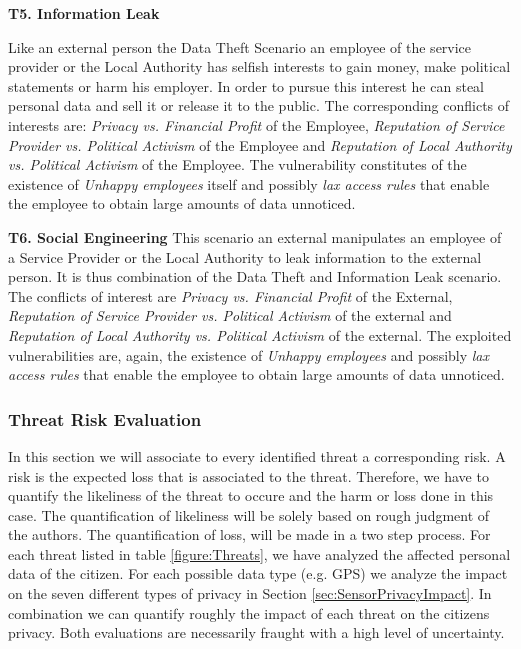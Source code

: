 \documentclass[runningheads,a4paper]{llncs}
\begin{document}
\textbf{T5. Information Leak}

Like an external person the Data Theft Scenario an employee of the
service provider or the Local Authority has selfish interests to gain
money, make political statements or harm his employer.  In order to
pursue this interest he can steal personal data and sell it or release
it to the public.  The corresponding conflicts of interests are:
\textit{Privacy vs. Financial Profit} of the Employee, \textit{Reputation of Service
  Provider vs. Political Activism} of the Employee and \textit{Reputation of Local
  Authority vs. Political Activism} of the Employee.  The vulnerability constitutes of
the existence of \textit{Unhappy employees} itself and possibly \textit{lax access
rules} that enable the employee to obtain large amounts of data
unnoticed.

\textbf{T6. Social Engineering}
This scenario an external manipulates an employee of a Service
Provider or the Local Authority to leak information to the external
person.  It is thus combination of the Data Theft and Information Leak
scenario.
The conflicts of interest are \textit{Privacy vs. Financial Profit} of
the External, \textit{Reputation of Service Provider vs. Political
  Activism} of the external and \textit{Reputation of Local Authority
  vs. Political Activism} of the external.  The exploited
vulnerabilities are, again, the existence of \textit{Unhappy
  employees} and possibly \textit{lax access rules} that enable the
employee to obtain large amounts of data unnoticed.


\subsubsection{Threat Risk Evaluation}

In this section we will associate to every identified threat a corresponding risk. A risk is the expected loss that is associated to the threat.
Therefore, we have to quantify the likeliness of the threat to occure and the harm or loss done in this case.
The quantification of likeliness will be solely based on rough judgment of the authors.
The quantification of loss, will be made in a two step process.
For each threat listed in table \ref{figure:Threats}, we have analyzed the affected personal data of the citizen.
For each possible data type (e.g. GPS) we analyze the impact on the seven different types of privacy in Section \ref{sec:SensorPrivacyImpact}.
In combination we can quantify roughly the impact of each threat on the citizens privacy. Both evaluations are necessarily fraught with a high level of uncertainty.
\end{document}
